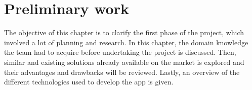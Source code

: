\chapter{Preliminary work}

\label{sec:prestudy}
The objective of this chapter is to clarify the first phase of the project, which involved a lot of planning and research. In this chapter, the domain knowledge the team had to acquire before undertaking the project is discussed. Then, similar and existing solutions already available on the market is explored and their advantages and drawbacks will be reviewed. Lastly, an overview of the different technologies used to develop the app is given.





